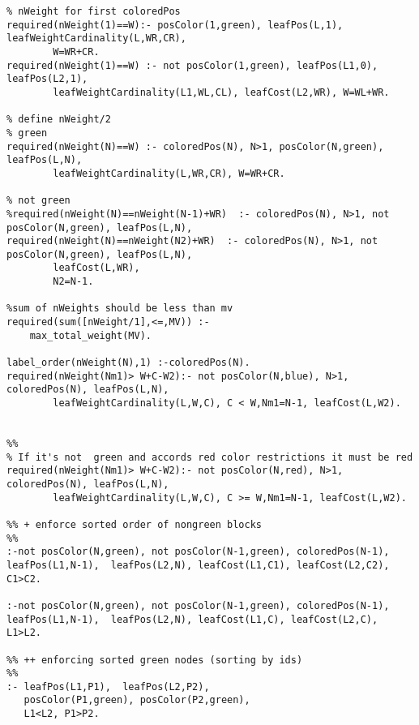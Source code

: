 \documentclass[]{article}
\begin{document}
\begin{lstlisting}
% nWeight for first coloredPos
required(nWeight(1)==W):- posColor(1,green), leafPos(L,1), leafWeightCardinality(L,WR,CR),
		W=WR+CR.
required(nWeight(1)==W) :- not posColor(1,green), leafPos(L1,0), leafPos(L2,1), 
		leafWeightCardinality(L1,WL,CL), leafCost(L2,WR), W=WL+WR.

% define nWeight/2
% green
required(nWeight(N)==W) :- coloredPos(N), N>1, posColor(N,green), leafPos(L,N), 
		leafWeightCardinality(L,WR,CR), W=WR+CR.

% not green
%required(nWeight(N)==nWeight(N-1)+WR)  :- coloredPos(N), N>1, not posColor(N,green), leafPos(L,N), 
required(nWeight(N)==nWeight(N2)+WR)  :- coloredPos(N), N>1, not posColor(N,green), leafPos(L,N), 
		leafCost(L,WR),
		N2=N-1.

%sum of nWeights should be less than mv
required(sum([nWeight/1],<=,MV)) :-
	max_total_weight(MV).

label_order(nWeight(N),1) :-coloredPos(N).
required(nWeight(Nm1)> W+C-W2):- not posColor(N,blue), N>1, coloredPos(N), leafPos(L,N),
        leafWeightCardinality(L,W,C), C < W,Nm1=N-1, leafCost(L,W2).


%%
% If it's not  green and accords red color restrictions it must be red
required(nWeight(Nm1)> W+C-W2):- not posColor(N,red), N>1, coloredPos(N), leafPos(L,N),
        leafWeightCardinality(L,W,C), C >= W,Nm1=N-1, leafCost(L,W2).

%% + enforce sorted order of nongreen blocks
%%
:-not posColor(N,green), not posColor(N-1,green), coloredPos(N-1),
leafPos(L1,N-1),  leafPos(L2,N), leafCost(L1,C1), leafCost(L2,C2), C1>C2.

:-not posColor(N,green), not posColor(N-1,green), coloredPos(N-1),
leafPos(L1,N-1),  leafPos(L2,N), leafCost(L1,C), leafCost(L2,C), L1>L2.

%% ++ enforcing sorted green nodes (sorting by ids)
%%
:- leafPos(L1,P1),  leafPos(L2,P2), 
   posColor(P1,green), posColor(P2,green), 
   L1<L2, P1>P2.
 \end{lstlisting}
\end{document}
